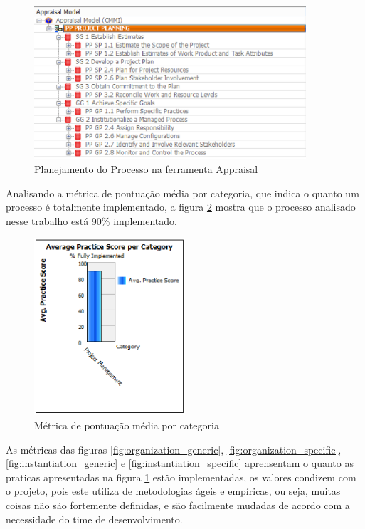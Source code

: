 \documentclass[a4paper, 11pt]{article}
\begin{document}
\begin{figure}[h]
  \centering
  \includegraphics[width=0.9\textwidth]{figuras/processo_appraisal.eps}
  \caption{Planejamento do Processo na ferramenta Appraisal}
  \label{fig:processo_appraisal}
\end{figure}

Analisando a métrica de pontuação média por categoria, que indica o quanto
um processo é totalmente implementado, a figura \ref{fig:pontuacao_media}
mostra que o processo analisado nesse trabalho está 90\% implementado.

\begin{figure}[h]
  \centering
  \includegraphics[width=0.5\textwidth]{figuras/pontuacao_media.eps}
  \caption{Métrica de pontuação média por categoria}
  \label{fig:pontuacao_media}
\end{figure}

As métricas das figuras \ref{fig:organization_generic},
\ref{fig:organization_specific}, \ref{fig:instantiation_generic} e
\ref{fig:instantiation_specific} aprensentam o quanto as praticas
apresentadas na figura \ref{fig:processo_appraisal} estão implementadas, os valores condizem com o
projeto, pois este utiliza de metodologias ágeis e empíricas, ou seja, muitas
coisas não são fortemente definidas, e são facilmente mudadas de acordo com
a necessidade do time de desenvolvimento.
\end{document}
